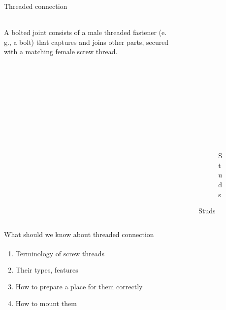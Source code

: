 \documentclass[aspectratio=169]{beamer}
\begin{document}
\begin{frame}[t]{Threaded connection}
    \framesubtitle{}
    \begin{columns}[T,onlytextwidth]
        \begin{column}{0.49\textwidth}
            A bolted joint consists of a male threaded fastener (e. g., a bolt) that captures and joins other parts, secured with a matching female screw thread.
        \end{column}
        \begin{column}{0.49\textwidth}
            \vspace{-1cm}
            \begin{figure}[H]
                \begin{subfigure}{0.99\textwidth}
                    \centering\includegraphics[height=3cm,width=1\textwidth,keepaspectratio]{threaded_types.png}
                    \label{fig:threaded_types.png}
                \end{subfigure}
                \begin{subfigure}{0.99\textwidth}
                    \centering\includegraphics[height=3cm,width=1\textwidth,keepaspectratio]{studs.jpg}
                    \caption*{Studs}
                    \label{fig:studs.jpg}
                \end{subfigure}
            \end{figure}
        \end{column}
    \end{columns}
\end{frame}

\begin{frame}[t]{What should we know about threaded connection}
    \framesubtitle{}
    \begin{enumerate}
        \item Terminology of screw threads
        \item Their types, features
        \item How to prepare a place for them correctly
        \item How to mount them
    \end{enumerate}
\end{frame}
\end{document}
